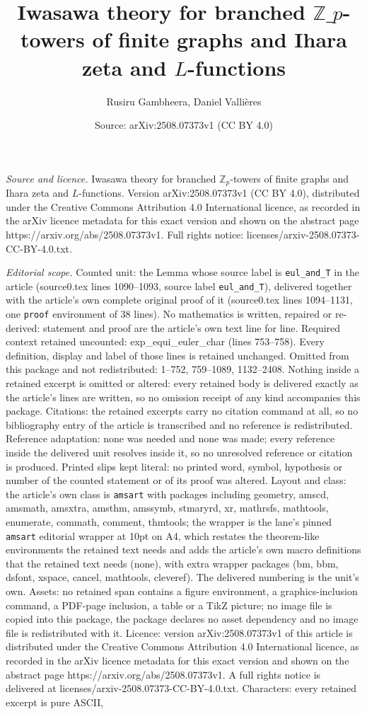 \documentclass[10pt,a4paper]{amsart}
\title[Iwasawa theory for branched $\mathbb{Z}\_{p}$-towers of finit]{Iwasawa theory for branched $\mathbb{Z}\_{p}$-towers of finite graphs and Ihara zeta and $L$-functions}
\author{Rusiru Gambheera, Daniel Valli\`eres}
\date{Source: arXiv:2508.07373v1 (CC BY 4.0)}
\begin{document}
\maketitle

\noindent\emph{Source and licence.} Iwasawa theory for branched $\mathbb{Z}_{p}$-towers of finite graphs and Ihara zeta and $L$-functions. Version arXiv:2508.07373v1 (CC BY 4.0), distributed under the Creative Commons Attribution 4.0 International licence, as recorded in the arXiv licence metadata for this exact version and shown on the abstract page https://arxiv.org/abs/2508.07373v1. Full rights notice: licenses/arxiv-2508.07373-CC-BY-4.0.txt.\par\smallskip

\noindent\textit{Editorial scope.} Counted unit: the Lemma whose source label is \texttt{eul\_and\_T} in the article (source0.tex lines 1090--1093, source label \texttt{eul\_and\_T}), delivered together with the article's own complete original proof of it (source0.tex lines 1094--1131, one \texttt{proof} environment of 38 lines). No mathematics is written, repaired or re-derived: statement and proof are the article's own text line for line. Required context retained uncounted: exp\_equi\_euler\_char (lines 753--758). Every definition, display and label of those lines is retained unchanged. Omitted from this package and not redistributed: 1--752, 759--1089, 1132--2408. Nothing inside a retained excerpt is omitted or altered: every retained body is delivered exactly as the article's lines are written, so no omission receipt of any kind accompanies this package. Citations: the retained excerpts carry no citation command at all, so no bibliography entry of the article is transcribed and no reference is redistributed. Reference adaptation: none was needed and none was made; every reference inside the delivered unit resolves inside it, so no unresolved reference or citation is produced. Printed slips kept literal: no printed word, symbol, hypothesis or number of the counted statement or of its proof was altered. Layout and class: the article's own class is \texttt{amsart} with packages including geometry, amscd, amsmath, amsxtra, amsthm, amssymb, stmaryrd, xr, mathrsfs, mathtools, enumerate, commath, comment, thmtools; the wrapper is the lane's pinned \texttt{amsart} editorial wrapper at 10pt on A4, which restates the theorem-like environments the retained text needs and adds the article's own macro definitions that the retained text needs (none), with extra wrapper packages (bm, bbm, dsfont, xspace, cancel, mathtools, cleveref). The delivered numbering is the unit's own. Assets: no retained span contains a figure environment, a graphics-inclusion command, a PDF-page inclusion, a table or a TikZ picture; no image file is copied into this package, the package declares no asset dependency and no image file is redistributed with it. Licence: version arXiv:2508.07373v1 of this article is distributed under the Creative Commons Attribution 4.0 International licence, as recorded in the arXiv licence metadata for this exact version and shown on the abstract page https://arxiv.org/abs/2508.07373v1. A full rights notice is delivered at licenses/arxiv-2508.07373-CC-BY-4.0.txt. Characters: every retained excerpt is pure ASCII, 
\end{document}

